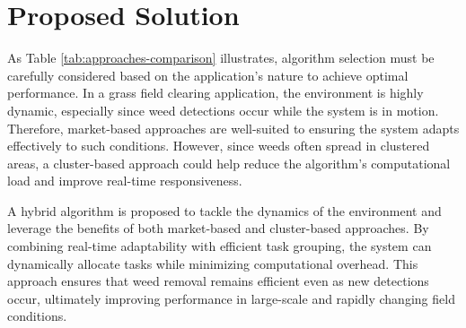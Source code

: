 \begin{table}[H]
    \centering
    \renewcommand{\arraystretch}{1.3} %
    \caption{A Comparison of different approaches to TA, Source \cite{10.1145/3700591}}
    \label{tab:approaches-comparison}
\end{table}

\section{Proposed Solution}
As Table \ref{tab:approaches-comparison} illustrates, algorithm selection must be carefully considered based on the application's nature to achieve optimal performance. In a grass field clearing application, the environment is highly dynamic, especially since weed detections occur while the system is in motion. Therefore, market-based approaches are well-suited to ensuring the system adapts effectively to such conditions. However, since weeds often spread in clustered areas, a cluster-based approach could help reduce the algorithm's computational load and improve real-time responsiveness.

A hybrid algorithm is proposed to tackle the dynamics of the environment and leverage the benefits of both market-based and cluster-based approaches. By combining real-time adaptability with efficient task grouping, the system can dynamically allocate tasks while minimizing computational overhead. This approach ensures that weed removal remains efficient even as new detections occur, ultimately improving performance in large-scale and rapidly changing field conditions.